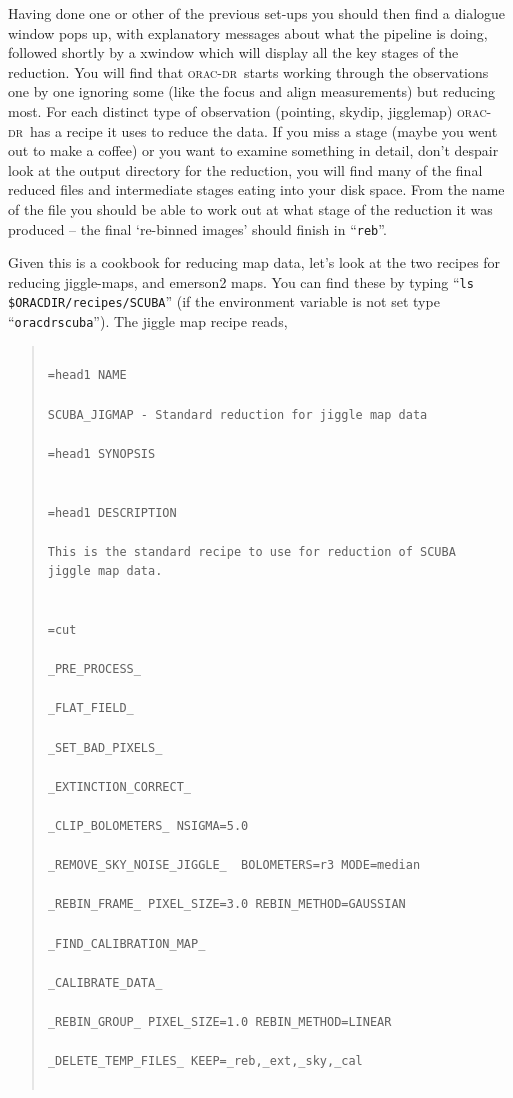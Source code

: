\documentclass[twoside,11pt]{article}
\newenvironment{myquote}{\begin{quote}\begin{small}}{\end{small}\end{quote}}
\newcommand{\oracdr}{\xref{\textsc{orac-dr}}{sun231}{}}
\newcommand{\xref}[3]{#1}
\renewcommand{\_}{\texttt{\symbol{95}}}
\begin{document}
Having done one or other of the previous set-ups you should then find
a dialogue window pops up, with explanatory messages about what the
pipeline is doing, followed shortly by a xwindow which will display
all the key stages of the reduction.  You will find that \oracdr\
starts working through the observations one by one ignoring some (like
the focus and align measurements) but reducing most.  For each
distinct type of observation (pointing, skydip, jigglemap) \oracdr\
has a recipe it uses to reduce the data.  If you miss a stage (maybe
you went out to make a coffee) or you want to examine something in
detail, don't despair look at the output directory for the reduction,
you will find many of the final reduced files and intermediate stages
eating into your disk space.  From the name of the file you should be
able to work out at what stage of the reduction it was produced -- the
final `re-binned images' should finish in ``\texttt{\_reb}''.

Given this is a cookbook for reducing map data, let's look at the two
recipes for reducing jiggle-maps, and emerson2 maps.  You can find
these by typing ``\texttt{ls \$ORAC\_DIR/recipes/SCUBA}'' (if the environment
variable is not set type ``\texttt{oracdr\_scuba}'').  The jiggle map recipe
reads,

\begin{myquote}
\begin{verbatim}

=head1 NAME

SCUBA_JIGMAP - Standard reduction for jiggle map data

=head1 SYNOPSIS


=head1 DESCRIPTION

This is the standard recipe to use for reduction of SCUBA
jiggle map data.


=cut

_PRE_PROCESS_

_FLAT_FIELD_

_SET_BAD_PIXELS_

_EXTINCTION_CORRECT_

_CLIP_BOLOMETERS_ NSIGMA=5.0

_REMOVE_SKY_NOISE_JIGGLE_  BOLOMETERS=r3 MODE=median

_REBIN_FRAME_ PIXEL_SIZE=3.0 REBIN_METHOD=GAUSSIAN

_FIND_CALIBRATION_MAP_

_CALIBRATE_DATA_

_REBIN_GROUP_ PIXEL_SIZE=1.0 REBIN_METHOD=LINEAR

_DELETE_TEMP_FILES_ KEEP=_reb,_ext,_sky,_cal


\end{verbatim}
\end{myquote}
\end{document}
